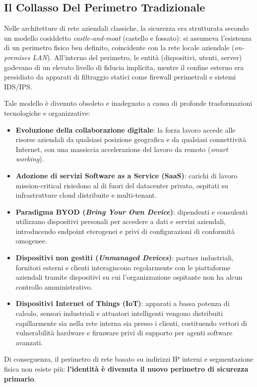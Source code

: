 \documentclass[11pt, a4paper]{article}
\begin{document}
\subsection{Il Collasso Del Perimetro Tradizionale}

Nelle architetture di rete aziendali classiche, la sicurezza era strutturata secondo un modello cosiddetto \emph{castle-and-moat} (castello e fossato): si assumeva l'esistenza di un perimetro fisico ben definito, coincidente con la rete locale aziendale (\emph{on-premises LAN}). All'interno del perimetro, le entità (dispositivi, utenti, server) godevano di un elevato livello di fiducia implicita, mentre il confine esterno era presidiato da apparati di filtraggio statici come firewall perimetrali e sistemi IDS/IPS.

Tale modello è divenuto obsoleto e inadeguato a causa di profonde trasformazioni tecnologiche e organizzative:
\begin{itemize}[leftmargin=*]
    \item \textbf{Evoluzione della collaborazione digitale}: la forza lavoro accede alle risorse aziendali da qualsiasi posizione geografica e da qualsiasi connettività Internet, con una massiccia accelerazione del lavoro da remoto (\emph{smart working}).
    \item \textbf{Adozione di servizi Software as a Service (SaaS)}: carichi di lavoro mission-critical risiedono al di fuori del datacenter privato, ospitati su infrastrutture cloud distribuite e multi-tenant.
    \item \textbf{Paradigma BYOD (\emph{Bring Your Own Device})}: dipendenti e consulenti utilizzano dispositivi personali per accedere a dati e servizi aziendali, introducendo endpoint eterogenei e privi di configurazioni di conformità omogenee.
    \item \textbf{Dispositivi non gestiti (\emph{Unmanaged Devices})}: partner industriali, fornitori esterni e clienti interagiscono regolarmente con le piattaforme aziendali tramite dispositivi su cui l'organizzazione ospitante non ha alcun controllo amministrativo.
    \item \textbf{Dispositivi Internet of Things (IoT)}: apparati a bassa potenza di calcolo, sensori industriali e attuatori intelligenti vengono distribuiti capillarmente sia nella rete interna sia presso i clienti, costituendo vettori di vulnerabilità hardware e firmware privi di supporto per agenti software avanzati.
\end{itemize}

Di conseguenza, il perimetro di rete basato su indirizzi IP interni e segmentazione fisica non esiste più: \textbf{l'identità è divenuta il nuovo perimetro di sicurezza primario}.
\end{document}
